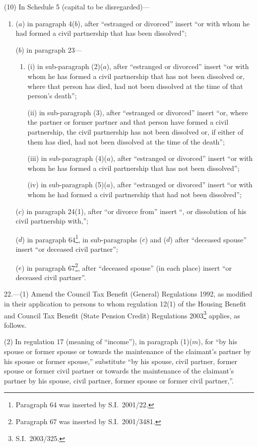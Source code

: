 \documentclass[12pt,a4paper]{article}
\begin{document}
(10) In Schedule 5 (capital to be disregarded)—
\begin{enumerate}\item[]
($a$) in paragraph 4($b$), after “estranged or divorced” insert “or with whom he had formed a civil partnership that has been dissolved”;

($b$) in paragraph 23—
\begin{enumerate}\item[]
(i) in sub-paragraph (2)($a$), after “estranged or divorced” insert “or with whom he has formed a civil partnership that has not been dissolved or, where that person has died, had not been dissolved at the time of that person’s death”;

(ii) in sub-paragraph (3), after “estranged or divorced” insert “or, where the partner or former partner and that person have formed a civil partnership, the civil partnership has not been dissolved or, if either of them has died, had not been dissolved at the time of the death”;

(iii) in sub-paragraph (4)($a$), after “estranged or divorced” insert “or with whom he has formed a civil partnership that has not been dissolved”;

(iv) in sub-paragraph (5)($a$), after “estranged or divorced” insert “or with whom he had formed a civil partnership that had not been dissolved”;
\end{enumerate}

($c$) in paragraph 24(1), after “or divorce from” insert “, or dissolution of his civil partnership with,”;

($d$) in paragraph 64\footnote{Paragraph 64 was inserted by S.I.\ 2001/22.}, in sub-paragraphs ($c$)  and ($d$)  after “deceased spouse” insert “or deceased civil partner”;

($e$) in paragraph 67\footnote{Paragraph 67 was inserted by S.I.\ 2001/3481.}, after “deceased spouse” (in each place) insert “or deceased civil partner”.
\end{enumerate}

\medskip

22.---(1)  Amend the Council Tax Benefit (General) Regulations 1992, as modified in their application to persons to whom regulation 12(1) of the Housing Benefit and Council Tax Benefit (State Pension Credit) Regulations 2003\footnote{S.I.\ 2003/325.} applies, as follows.

(2) In regulation 17 (meaning of “income”), in paragraph (1)($m$), for “by his spouse or former spouse or towards the maintenance of the claimant’s partner by his spouse or former spouse,” substitute “by his spouse, civil partner, former spouse or former civil partner or towards the maintenance of the claimant’s partner by his spouse, civil partner, former spouse or former civil partner,”.
\end{document}
